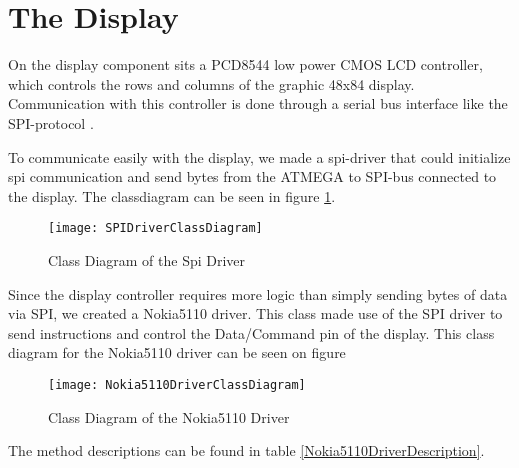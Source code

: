 \section{The Display}
On the display component sits a PCD8544 low power CMOS LCD controller, which controls the rows and columns of the graphic 48x84 display. Communication with this controller is done through a serial bus interface like the SPI-protocol \cite{NokiaDisplay}.


To communicate easily with the display, we made a spi-driver that could initialize spi communication and send bytes from the ATMEGA to SPI-bus connected to the display. The classdiagram can be seen in figure \ref{SpiDriverClassDiagram}.

\begin{figure}[H]
	\texttt{[image: SPIDriverClassDiagram]}
	\centering
	\caption{Class Diagram of the Spi Driver}
	\label{SpiDriverClassDiagram}
\end{figure}

Since the display controller requires more logic than simply sending bytes of data via SPI, we created a Nokia5110 driver. This class made use of the SPI driver to send instructions and control the Data/Command pin of the display. This class diagram for the Nokia5110 driver can be seen on figure 

\begin{figure}[H]
	\texttt{[image: Nokia5110DriverClassDiagram]}
	\centering
	\caption{Class Diagram of the Nokia5110 Driver}
	\label{Nokia5110DriverClassDiagram}
\end{figure}

The method descriptions can be found in table \ref{Nokia5110DriverDescription}.

